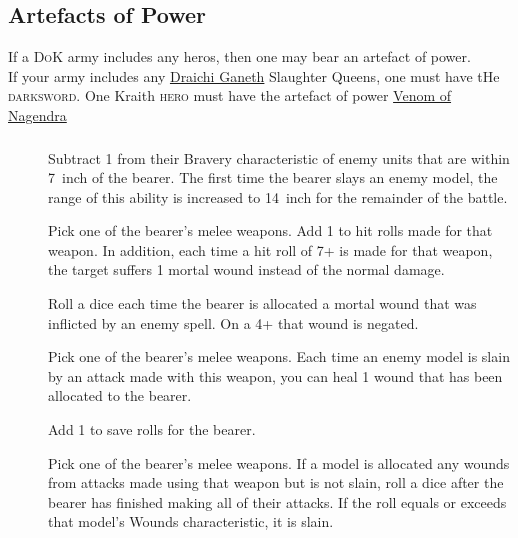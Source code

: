 \hypertarget{artefacts-of-power}{%
    \subsection{Artefacts of Power}\label{artefacts-of-power}}
If a \textsc{DoK} army includes any heros, then one may bear an
artefact of power. \\
If your army includes any \hyperref[draichi-ganeth]{Draichi Ganeth} Slaughter
Queens, one must have tHe \textsc{darksword}.
One Kraith \textsc{hero} must have the artefact of power
\hyperref[venom-of-nagendra]{Venom of Nagendra}

\subsubsection{}
\begin{description} 
    \item [] Subtract 1 from their Bravery
        characteristic of enemy units that are within 7~inch of the bearer. The
        first time the bearer slays an enemy model, the range of this ability
        is increased to 14~inch for the remainder of the battle.
    \item [] Pick one of the bearer’s melee
        weapons. Add 1 to hit rolls made for that weapon. In addition, each
        time a hit roll of 7+ is made for that weapon, the target suffers
        1 mortal wound instead of the normal damage.
    \item [] Roll a dice each
        time the bearer is allocated a mortal wound that was inflicted by an
        enemy spell. On a 4+ that wound is negated.
    \item [] Pick one of the bearer’s melee
        weapons. Each time an enemy model is slain by an attack made with this
        weapon, you can heal 1 wound that has been allocated to the bearer.
    \item [] Add 1 to save rolls for the bearer.
    \item [] Pick one of the bearer’s
        melee weapons. If a model is allocated any wounds from attacks made
        using that weapon but is not slain, roll a dice after the bearer has
        finished making all of their attacks. If the roll equals or exceeds
        that model’s Wounds characteristic, it is slain.
\end{description} 

